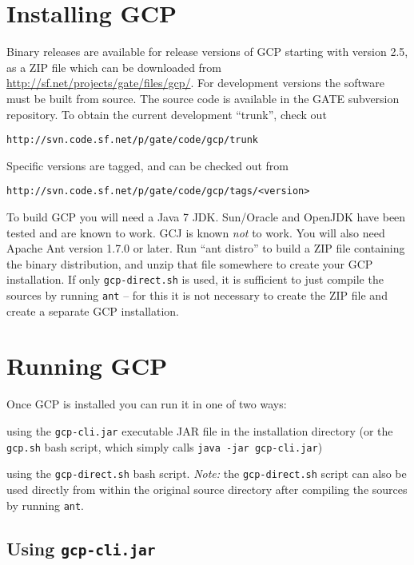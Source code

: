 \section{Installing GCP}

Binary releases are available for release versions of GCP starting with
version 2.5, as a ZIP file which can be downloaded from
\url{http://sf.net/projects/gate/files/gcp/}.  For development versions the
software must be built from source.  The source code is available in the GATE
subversion repository.  To obtain the current development ``trunk'', check out
\begin{verbatim}
http://svn.code.sf.net/p/gate/code/gcp/trunk
\end{verbatim}
%
Specific versions are tagged, and can be checked out from
\begin{verbatim}
http://svn.code.sf.net/p/gate/code/gcp/tags/<version>
\end{verbatim}

To build GCP you will need a Java 7 JDK.  Sun/Oracle and OpenJDK have been
tested and are known to work.  GCJ is known {\em not} to work.  You will also
need Apache Ant version 1.7.0 or later.  Run ``ant distro'' to build a ZIP file
containing the binary distribution, and unzip that file somewhere to create
your GCP installation. If only \verb!gcp-direct.sh! is used, it is sufficient
to just compile the sources by running \verb!ant! -- for this it is not 
necessary to create the ZIP file and create a separate GCP installation. 

\section{Running GCP}

Once GCP is installed you can run it in one of two ways:
\bit
\item using the \verb!gcp-cli.jar! executable
JAR file in the installation directory (or the \verb!gcp.sh! bash script, which
simply calls \verb!java -jar gcp-cli.jar!)
\item using the \verb!gcp-direct.sh! bash script. \emph{Note:} the \verb!gcp-direct.sh!
script can also be used directly from within the original source directory
after compiling the sources by running \verb!ant!. 
\eit

\subsection{Using {\tt gcp-cli.jar}}

